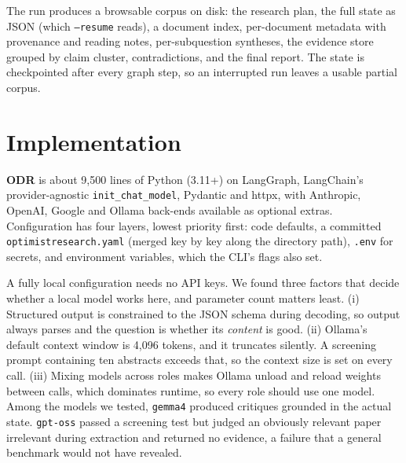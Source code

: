 \documentclass[10pt,a4paper]{article}
\newcommand{\hfont}{\sffamily}
\renewcommand{\paragraph}[1]{%
  \par\vspace{0.35em}{\hfont\bfseries\color{accent}#1}\hspace{0.6em}\ignorespaces}
\newcommand{\code}[1]{\texttt{#1}}
\newcommand{\sys}{{\hfont\bfseries ODR}}
\begin{document}
The run produces a browsable corpus on disk: the research plan, the full
state as JSON (which \code{--resume} reads), a document index, per-document
metadata with provenance and reading notes, per-subquestion syntheses, the
evidence store grouped by claim cluster, contradictions, and the final
report. The state is checkpointed after every graph step, so an interrupted
run leaves a usable partial corpus.

\section{Implementation}
\label{sec:impl}

\sys{} is about 9{,}500 lines of Python (3.11+) on LangGraph, LangChain's
provider-agnostic \code{init\_chat\_model}, Pydantic and httpx, with
Anthropic, OpenAI, Google and Ollama back-ends available as optional
extras. Configuration has four layers, lowest priority first: code
defaults, a committed \code{optimistresearch.yaml} (merged key by key along the
directory path), \code{.env} for secrets, and environment variables, which
the CLI's flags also set.

\paragraph{Local models.} A fully local configuration needs no API keys.
We found three factors that decide whether a local model works here, and
parameter count matters least. (i) Structured output is constrained to the
JSON schema during decoding, so output always parses and the question is
whether its \emph{content} is good. (ii) Ollama's default context window
is 4{,}096 tokens, and it truncates silently. A screening prompt containing
ten abstracts exceeds that, so the context size is set on every call. (iii)
Mixing models across roles makes Ollama unload and reload weights between
calls, which dominates runtime, so every role should use one model.
Among the models we tested, \code{gemma4} produced critiques grounded in
the actual state. \code{gpt-oss} passed a screening test but judged an
obviously relevant paper irrelevant during extraction and returned no
evidence, a failure that a general benchmark would not have revealed.
\end{document}
